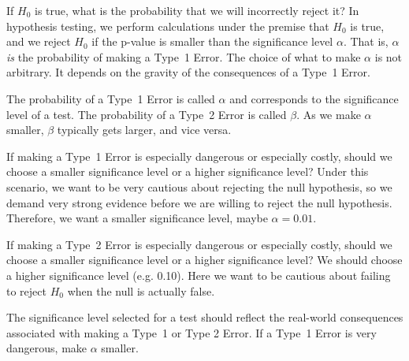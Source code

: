 
If $H_0$ is true, what is the probability that we will incorrectly reject it? In hypothesis testing, we perform calculations under the premise that $H_0$ is true, and we reject $H_0$ if the p-value is smaller than the significance level $\alpha$. That is, $\alpha$ \emph{is} the probability of making a Type~1 Error. The choice of what to make $\alpha$ is not arbitrary. It depends on the gravity of the consequences of a Type~1 Error.


\begin{termBox}{
The probability of a Type~1 Error is called $\alpha$ and corresponds to the significance level of a test. The probability of a Type~2 Error is called $\beta$. As we make $\alpha$ smaller, $\beta$ typically gets larger, and vice versa.}
\end{termBox}

\begin{example}{If making a Type~1 Error is especially dangerous or especially costly, should we choose a smaller significance level or a higher significance level?}
Under this scenario, we want to be very cautious about rejecting the null hypothesis, so we demand very strong evidence before we are willing to reject the null hypothesis. Therefore, we want a smaller significance level, maybe $\alpha = 0.01$.
\end{example}


\begin{example}{If making a Type~2 Error is especially dangerous or especially costly, should we choose a smaller significance level or a higher significance level?}
We should choose a higher significance level (e.g. 0.10). Here we want to be cautious about failing to reject $H_0$ when the null is actually false.
\end{example}

\begin{tipBox}{
The significance level selected for a test should reflect the real-world consequences associated with making a Type~1 or Type 2 Error. If a Type~1 Error is very dangerous, make $\alpha$ smaller.}
\end{tipBox}

